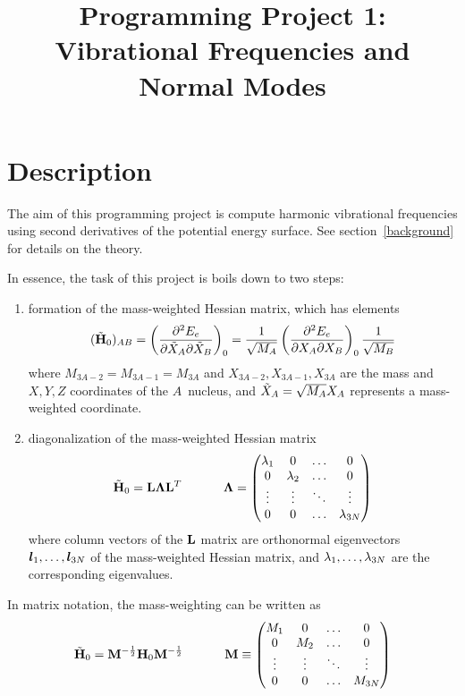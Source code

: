 \documentclass[11pt]{article}
\title{Programming Project 1: Vibrational Frequencies and Normal Modes}
\date{}
\begin{document}
\maketitle

\section*{Description}
The aim of this programming project is compute harmonic vibrational frequencies
using second derivatives of the potential energy surface. See
section~\ref{background} for details on the theory.

In essence, the task of this project is boils down to two steps:
\begin{enumerate}
    \item formation of the mass-weighted Hessian matrix, which has elements
\begin{align}
(\tilde{\mathbf{H}}_0)_{AB}
    = \left(\dfrac{\partial^2E_e}{\partial\tilde{X}_A \partial\tilde{X}_B}\right)_0
    = \dfrac{1}{\sqrt{M_A}} \left(\dfrac{\partial^2E_e}{\partial X_A\partial X_B}\right)_0 \dfrac{1}{\sqrt{M_B}}
\end{align}
where $M_{3A-2} = M_{3A-1} = M_{3A}$ and $X_{3A-2}, X_{3A-1}, X_{3A}$ are the
mass and $X,Y,Z$ coordinates of the $A$\eth\ nucleus, and
$\tilde{X}_A = \sqrt{M_A} X_A$ represents a mass-weighted coordinate.
    \item diagonalization of the mass-weighted Hessian matrix
\begin{align}
\tilde{\mathbf{H}}_0
    = \mathbf{L} \bm{\Lambda} \mathbf{L}^T \ \ \ \ \ \ \ \ \ \  \bm{\Lambda}
    = \left(\begin{matrix}\lambda_1&   0   &  \ldots  &    0     \\
            0  & \lambda_2 &  \ldots  &    0     \\
           \vdots &  \vdots  &  \ddots  &   \vdots    \\
            0  &   0   &  \ldots  & \lambda_{3N} \end{matrix}\right)
\end{align}
where column vectors of the $\mathbf{L}$ matrix are orthonormal eigenvectors
$\bm{l}_1, \ldots, \bm{l}_{3N}$ of the mass-weighted Hessian matrix, and
$\lambda_1, \ldots, \lambda_{3N}$ are the corresponding eigenvalues.
\end{enumerate}
In matrix notation, the mass-weighting can be written as
\begin{align}
    \tilde{\mathbf{H}}_0
=   \mathbf{M}^{-\frac{1}{2}} \mathbf{H}_0 \mathbf{M}^{-\frac{1}{2}}
\ \ \ \ \ \ \ \ \ \  \mathbf{M}
\equiv
    \left(\begin{matrix} M_1 &  0  & \ldots &   0    \\
          0  & M_2 & \ldots &   0    \\
         \vdots & \vdots & \ddots &  \vdots   \\
          0  & 0   & \ldots & M_{3N} \end{matrix}\right)
\end{align}
\end{document}
